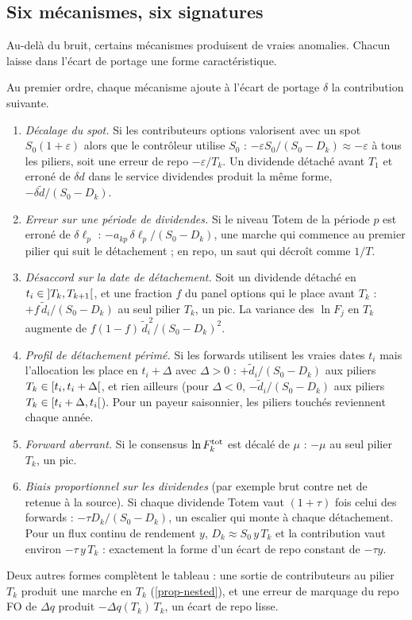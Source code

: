 \subsection{Six mécanismes, six signatures}\label{sec-signatures}
Au-delà du bruit, certains mécanismes produisent de vraies anomalies. Chacun laisse dans l'écart de portage une forme
caractéristique.

\begin{proposition}[Signatures]\label{prop-signatures}
Au premier ordre, chaque mécanisme ajoute à l'écart de portage $\delta$ la contribution suivante.
\begin{enumerate}[label=(\roman*)]
\item \emph{Décalage du spot.} Si les contributeurs options valorisent avec un spot $S_0(1+\varepsilon)$ alors que le
contrôleur utilise $S_0$ : $-\varepsilon S_0/(S_0-D_k)\approx-\varepsilon$ à tous les piliers, soit une erreur de
repo $-\varepsilon/T_k$. Un dividende détaché avant $T_1$ et erroné de $\delta d$ dans le service dividendes produit la
même forme, $-\delta\tilde d/(S_0-D_k)$.
\item \emph{Erreur sur une période de dividendes.} Si le niveau Totem de la période $p$ est erroné de $\delta\ell_p$ :
$-a_{kp}\,\delta\ell_p/(S_0-D_k)$, une marche qui commence au premier pilier qui suit le détachement ; en repo, un saut
qui décroît comme $1/T$.
\item \emph{Désaccord sur la date de détachement.} Soit un dividende détaché en $t_i\in\mathopen{]}T_k, T_{k+1}\mathclose{[}$, et une
fraction $f$ du panel options qui le place avant $T_k$ : $+f\,\tilde d_i/(S_0-D_k)$ au seul pilier $T_k$, un pic. La
variance des $\ln F_j$ en $T_k$ augmente de $f(1-f)\,\tilde d_i^{\,2}/(S_0-D_k)^2$.
\item \emph{Profil de détachement périmé.} Si les forwards utilisent les vraies dates $t_i$ mais l'allocation les
place en $t_i+\Delta$ avec $\Delta>0$ : $+\tilde d_i/(S_0-D_k)$ aux piliers $T_k\in\mathopen{[}t_i, t_i+\Delta\mathclose{[}$, et rien
ailleurs (pour $\Delta<0$, $-\tilde d_i/(S_0-D_k)$ aux piliers $T_k\in\mathopen{[}t_i+\Delta, t_i\mathclose{[}$). Pour un payeur
saisonnier, les piliers touchés reviennent chaque année.
\item \emph{Forward aberrant.} Si le consensus $\ln F^{\mathrm{tot}}_k$ est décalé de $\mu$ : $-\mu$ au seul pilier $T_k$,
un pic.
\item \emph{Biais proportionnel sur les dividendes} (par exemple brut contre net de retenue à la source). Si chaque
dividende Totem vaut $(1+\tau)$ fois celui des forwards : $-\tau D_k/(S_0-D_k)$, un escalier qui monte à chaque
détachement. Pour un flux continu de rendement $y$, $D_k\approx S_0\,y\,T_k$ et la contribution vaut environ
$-\tau\,y\,T_k$ : exactement la forme d'un écart de repo constant de $-\tau y$.
\end{enumerate}
Deux autres formes complètent le tableau : une sortie de contributeurs au pilier $T_k$ produit une marche en $T_k$
(\cref{prop-nested}), et une erreur de marquage du repo FO de $\Delta q$ produit $-\Delta q(T_k)\,T_k$, un écart de
repo lisse.
\end{proposition}
